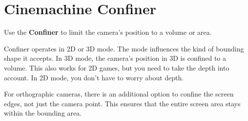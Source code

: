 \chapter{Cinemachine Confiner}
\hypertarget{md__hey_tea_9_2_library_2_package_cache_2com_8unity_8cinemachine_0d2_89_87_2_documentation_0i_2_cinemachine_confiner}{}\label{md__hey_tea_9_2_library_2_package_cache_2com_8unity_8cinemachine_0d2_89_87_2_documentation_0i_2_cinemachine_confiner}
\label{md__hey_tea_9_2_library_2_package_cache_2com_8unity_8cinemachine_0d2_89_87_2_documentation_0i_2_cinemachine_confiner_autotoc_md673}%
%
 Use the {\bfseries{ Confiner}}  to limit the camera’s position to a volume or area.

Confiner operates in 2D or 3D mode. The mode influences the kind of bounding shape it accepts. In 3D mode, the camera’s position in 3D is confined to a volume. This also works for 2D games, but you need to take the depth into account. In 2D mode, you don’t have to worry about depth.

For orthographic cameras, there is an additional option to confine the screen edges, not just the camera point. This ensures that the entire screen area stays within the bounding area.

